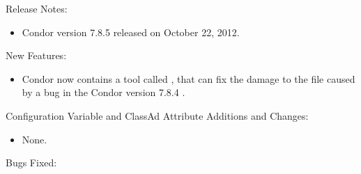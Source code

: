 \noindent Release Notes:

\begin{itemize}

\item Condor version 7.8.5 released on October 22, 2012.

\end{itemize}


\noindent New Features:

\begin{itemize}

\item Condor now contains a tool called , 
that can fix the damage to the file  
caused by a bug in the Condor version 7.8.4 .

\end{itemize}

\noindent Configuration Variable and ClassAd Attribute Additions and Changes:

\begin{itemize}

\item None.

\end{itemize}

\noindent Bugs Fixed:

